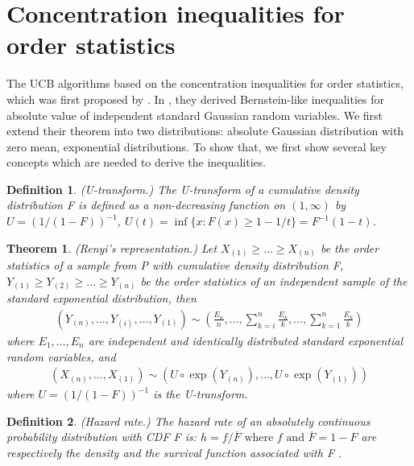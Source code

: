 \documentclass{article}
\theoremstyle{plain}
\newtheorem{theo}{Theorem}
\newtheorem{defi}{Definition}
\begin{document}
\section{Concentration inequalities for order statistics}
The UCB algorithms based on the concentration inequalities for order statistics, which was first proposed by \cite{boucheron2012}. In \cite{boucheron2012}, they derived Bernstein-like inequalities for absolute value of independent standard Gaussian random variables. We first extend their theorem into two distributions: absolute Gaussian distribution with zero mean, exponential distributions. To show that, we first show several key concepts which are needed to derive the inequalities. 


\begin{defi} (U-transform.) 
\label{defi: U-transform}
The U-transform of a cumulative density distribution F is defined as a non-decreasing function on $(1, \infty)$ by $U = (1/(1-F))^{-1}$, $U(t) = \inf\{x: F(x) \geq 1 - 1/t\} = F^{-1}(1-t)$.
\end{defi}

\begin{theo} (Renyi's representation.) Let $X_{(1)} \geq \ldots \geq X_{(n)}$ be the order statistics of a sample from P with cumulative density distribution F, $Y_{(1)} \geq Y_{(2)} \geq \ldots \geq Y_{(n)}$ be the
order statistics of an independent sample of the standard exponential distribution, then
\begin{align}
    \left(Y_{(n)}, \ldots, Y_{(i)}, \ldots, Y_{(1)}\right) \sim\left(\frac{E_{n}}{n}, \ldots, \sum_{k=i}^{n} \frac{E_{k}}{k}, \ldots, \sum_{k=1}^{n} \frac{E_{k}}{k}\right)
\end{align}
where $E_{1}, \ldots, E_{n}$ are independent and identically distributed standard exponential random variables, and
\begin{align}
    \left(X_{(n)}, \ldots, X_{(1)}\right) \sim\left(U \circ \exp \left(Y_{(n)}\right), \ldots, U \circ \exp \left(Y_{(1)}\right)\right)
\end{align}
where $U=(1 /(1-F))^{-1}$ is the U-transform.
\end{theo}

\begin{defi} (Hazard rate.) The hazard rate of an absolutely continuous probability distribution with CDF F is: $h=f / \overline{F} \text { where } f \text { and } \overline{F}=1-F$ are respectively the density and the survival function associated with F .
\end{defi}
\end{document}
